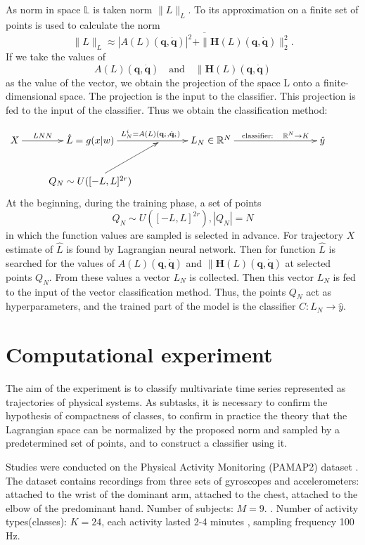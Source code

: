\documentclass[12pt]{paper}
\begin{document}
As norm in space $\mathbb{L}$ is taken norm $\|L\|_L$. To its approximation on a finite set of points is used to calculate the norm 
\[
\|L\|_L \approx \overline{|A(L)\left(\mathbf{q}, \dot{\mathbf{q}}\right)|^2 + \|\mathbf{H}(L)\left(\mathbf{q}, \dot{\mathbf{q}}\right)\|_2^2}.
\] 
If we take the values of 
\[A(L)\left(\mathbf{q}, \dot{\mathbf{q}}\right) 
\quad \text{and} \quad 
\|\mathbf{H}(L)\left(\mathbf{q}, \dot{\mathbf{q}}\right) 
\]
as the value of the vector, we obtain the projection of the space L onto a finite-dimensional space. The projection is the input to the classifier. This projection is fed to the input of the classifier. Thus we obtain the classification method: 

\begin{equation}
\xymatrix{
X  \ar@{->}[r]^-{LNN}  & \hat{L}=g(x|w) \ar@{->}[rr]^{{L_N^{i} = A(L)\left(\mathbf{q}_i, \dot{\mathbf{q}}_i\right)}} & {} & L_N \in \mathbb{R}^N \ar@{->}[rrr]^-{\text{classifier}:\quad \mathbb{R}^N \to K} &  &  & \hat{y} \\
 & Q_N \sim U([-L, L]^{2r}) \ar@{->}[ur]  &  &  &  &  &  &
}
\label{fig: classificator}
\end{equation}
At the beginning, during the training phase, a set of points 
\[
Q_N \sim U([-L, L]^{2r}), |Q_N| = N
\] 
in which the function values are sampled is selected in advance. For trajectory $X$ estimate of $\hat{L}$ is found by Lagrangian neural network. Then for
function $\hat{L}$ is searched for the values of $A(L)\left(\mathbf{q}, \dot{\mathbf{q}}\right)$ and $\|\mathbf{H}(L)\left(\mathbf{q}, \dot{\mathbf{q}}\right)$ at selected points $Q_N$. From these values a vector $L_N$ is collected. Then this vector $L_N$ is fed to the input of the vector classification method. Thus, the points  $Q_N$ act as hyperparameters, and the trained part of the model is the classifier $C: L_N \to \hat{y}$.

\section{Computational experiment}
The aim of the experiment is to classify multivariate time series represented as trajectories
of physical systems. As subtasks, it is necessary to confirm the hypothesis of compactness of
classes, to confirm in practice the theory that the Lagrangian space can be normalized by the
proposed norm and sampled by a predetermined set of points, and to construct a classifier using
it.

Studies were conducted on the Physical Activity Monitoring (PAMAP2) dataset \cite{dataset}.
The
dataset contains recordings from three sets of gyroscopes and accelerometers: attached to the
wrist of the dominant arm, attached to the chest, attached to the elbow of the predominant hand. Number of subjects: $M = 9$. . Number of activity types(classes): $K = 24$, each activity lasted 2-4 minutes \cite{dataset}, sampling frequency 100 Hz.
\end{document}
